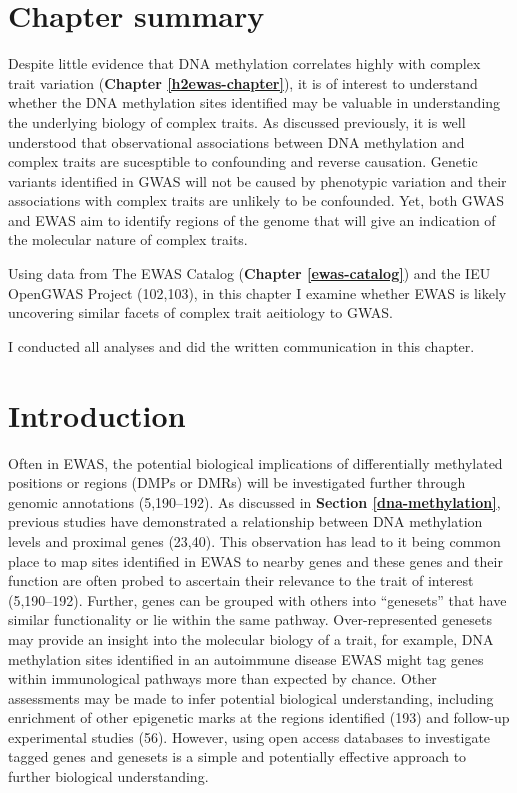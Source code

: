 \documentclass[11pt,oneside]{bristolthesis}
\begin{document}
\hypertarget{chapter-summary-06}{%
\section{Chapter summary}\label{chapter-summary-06}}

Despite little evidence that DNA methylation correlates highly with complex trait variation (\textbf{Chapter \ref{h2ewas-chapter}}), it is of interest to understand whether the DNA methylation sites identified may be valuable in understanding the underlying biology of complex traits. As discussed previously, it is well understood that observational associations between DNA methylation and complex traits are sucesptible to confounding and reverse causation. Genetic variants identified in GWAS will not be caused by phenotypic variation and their associations with complex traits are unlikely to be confounded. Yet, both GWAS and EWAS aim to identify regions of the genome that will give an indication of the molecular nature of complex traits.

Using data from The EWAS Catalog (\textbf{Chapter \ref{ewas-catalog}}) and the IEU OpenGWAS Project (102,103), in this chapter I examine whether EWAS is likely uncovering similar facets of complex trait aeitiology to GWAS.

I conducted all analyses and did the written communication in this chapter.

\hypertarget{introduction-06}{%
\section{Introduction}\label{introduction-06}}

Often in EWAS, the potential biological implications of differentially methylated positions or regions (DMPs or DMRs) will be investigated further through genomic annotations (5,190--192). As discussed in \textbf{Section \ref{dna-methylation}}, previous studies have demonstrated a relationship between DNA methylation levels and proximal genes (23,40). This observation has lead to it being common place to map sites identified in EWAS to nearby genes and these genes and their function are often probed to ascertain their relevance to the trait of interest (5,190--192). Further, genes can be grouped with others into ``genesets'' that have similar functionality or lie within the same pathway. Over-represented genesets may provide an insight into the molecular biology of a trait, for example, DNA methylation sites identified in an autoimmune disease EWAS might tag genes within immunological pathways more than expected by chance. Other assessments may be made to infer potential biological understanding, including enrichment of other epigenetic marks at the regions identified (193) and follow-up experimental studies (56). However, using open access databases to investigate tagged genes and genesets is a simple and potentially effective approach to further biological understanding.
\end{document}
